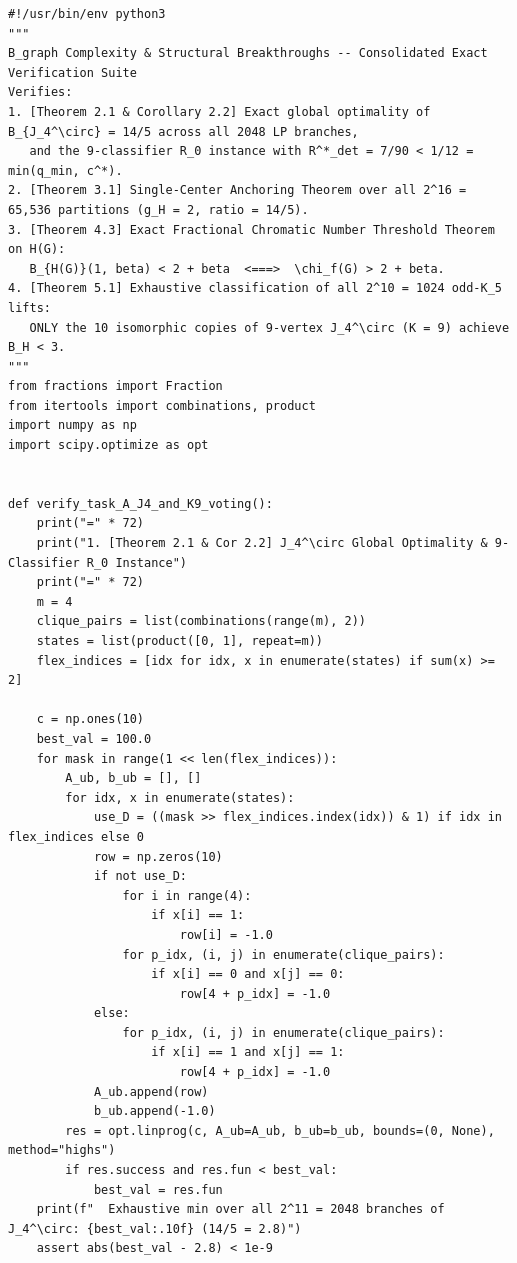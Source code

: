 \documentclass[11pt,a4paper]{ctexart}
\theoremstyle{definition}
\newcommand{\1}{\boldsymbol 1}
\newcommand{\0}{\boldsymbol 0}
\begin{document}
\begin{lstlisting}[style=pycode,caption={一般 $B_{\rm graph}$ 核心定理与 9 分类器 $R_0$ 反例精确复核脚本（\texttt{Bgraph\_breakthrough\_verify.py}）}]
#!/usr/bin/env python3
"""
B_graph Complexity & Structural Breakthroughs -- Consolidated Exact Verification Suite
Verifies:
1. [Theorem 2.1 & Corollary 2.2] Exact global optimality of B_{J_4^\circ} = 14/5 across all 2048 LP branches,
   and the 9-classifier R_0 instance with R^*_det = 7/90 < 1/12 = min(q_min, c^*).
2. [Theorem 3.1] Single-Center Anchoring Theorem over all 2^16 = 65,536 partitions (g_H = 2, ratio = 14/5).
3. [Theorem 4.3] Exact Fractional Chromatic Number Threshold Theorem on H(G):
   B_{H(G)}(1, beta) < 2 + beta  <===>  \chi_f(G) > 2 + beta.
4. [Theorem 5.1] Exhaustive classification of all 2^10 = 1024 odd-K_5 lifts:
   ONLY the 10 isomorphic copies of 9-vertex J_4^\circ (K = 9) achieve B_H < 3.
"""
from fractions import Fraction
from itertools import combinations, product
import numpy as np
import scipy.optimize as opt


def verify_task_A_J4_and_K9_voting():
    print("=" * 72)
    print("1. [Theorem 2.1 & Cor 2.2] J_4^\circ Global Optimality & 9-Classifier R_0 Instance")
    print("=" * 72)
    m = 4
    clique_pairs = list(combinations(range(m), 2))
    states = list(product([0, 1], repeat=m))
    flex_indices = [idx for idx, x in enumerate(states) if sum(x) >= 2]

    c = np.ones(10)
    best_val = 100.0
    for mask in range(1 << len(flex_indices)):
        A_ub, b_ub = [], []
        for idx, x in enumerate(states):
            use_D = ((mask >> flex_indices.index(idx)) & 1) if idx in flex_indices else 0
            row = np.zeros(10)
            if not use_D:
                for i in range(4):
                    if x[i] == 1:
                        row[i] = -1.0
                for p_idx, (i, j) in enumerate(clique_pairs):
                    if x[i] == 0 and x[j] == 0:
                        row[4 + p_idx] = -1.0
            else:
                for p_idx, (i, j) in enumerate(clique_pairs):
                    if x[i] == 1 and x[j] == 1:
                        row[4 + p_idx] = -1.0
            A_ub.append(row)
            b_ub.append(-1.0)
        res = opt.linprog(c, A_ub=A_ub, b_ub=b_ub, bounds=(0, None), method="highs")
        if res.success and res.fun < best_val:
            best_val = res.fun
    print(f"  Exhaustive min over all 2^11 = 2048 branches of J_4^\circ: {best_val:.10f} (14/5 = 2.8)")
    assert abs(best_val - 2.8) < 1e-9


\end{lstlisting}
\end{document}
